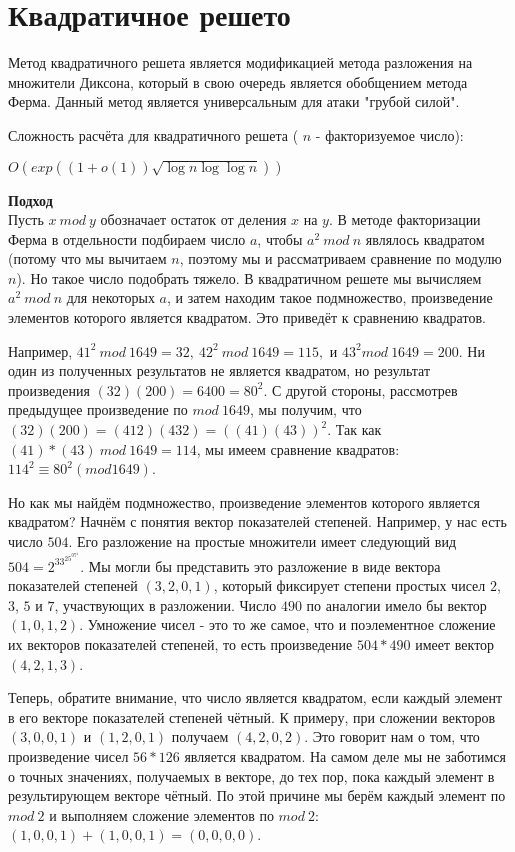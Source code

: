 \documentclass[12pt,a4paper]{scrartcl}
\begin{document}
\section{Квадратичное решето}

Метод квадратичного решета является модификацией метода разложения на множители Диксона, который в свою очередь является обобщением метода Ферма. Данный метод является универсальным для атаки "грубой силой".

Сложность расчёта для квадратичного решета ( $n$ - факторизуемое число):

\begin{center}
	$O(exp((1+o(1)){\sqrt {\log n\log \log n}}))$
\end{center}

\textbf{Подход}\\

Пусть $x\ mod\ y$ обозначает остаток от деления $x$ на $y$. В методе факторизации Ферма в отдельности подбираем число $a$, чтобы $a^2\ mod\ n$ являлось квадратом (потому что мы вычитаем $n$, поэтому мы и рассматриваем сравнение по модулю $n$). Но такое число подобрать тяжело. В квадратичном решете мы вычисляем $a^2\ mod\ n$ для некоторых $a$, и затем находим такое подмножество, произведение элементов которого является квадратом. Это приведёт к сравнению квадратов.

Например, $41^2\ mod\ 1649 = 32,\ 42^2\ mod\ 1649 = 115,$ и $43^2 mod\ 1649 = 200$. Ни один из полученных результатов не является квадратом, но результат произведения $(32)(200) = 6400 = 80^2$. С другой стороны, рассмотрев предыдущее произведение по $mod\ 1649$, мы получим, что $(32)(200) = (412)(432) = ((41)(43))^2$. Так как $(41)*(43)\ mod\ 1649 = 114$, мы имеем сравнение квадратов: $114^2 \equiv 80^2 (mod 1649)$.

Но как мы найдём подмножество, произведение элементов которого является квадратом? Начнём с понятия вектор показателей степеней. Например, у нас есть число $504$. Его разложение на простые множители имеет следующий вид $504 = 2^33^25^07^1$. Мы могли бы представить это разложение в виде вектора показателей степеней $(3,2,0,1)$, который фиксирует степени простых чисел $2$, $3$, $5$ и $7$, участвующих в разложении. Число $490$ по аналогии имело бы вектор $(1,0,1,2)$. Умножение чисел - это то же самое, что и поэлементное сложение их векторов показателей степеней, то есть произведение $504*490$ имеет вектор $(4,2,1,3)$.

Теперь, обратите внимание, что число является квадратом, если каждый элемент в его векторе показателей степеней чётный. К примеру, при сложении векторов $(3,0,0,1)$ и $(1,2,0,1)$ получаем $(4,2,0,2)$. Это говорит нам о том, что произведение чисел $56*126$ является квадратом. На самом деле мы не заботимся о точных значениях, получаемых в векторе, до тех пор, пока каждый элемент в результирующем векторе чётный. По этой причине мы берём каждый элемент по $mod\ 2$ и выполняем сложение элементов по $mod\ 2$: $(1,0,0,1) + (1,0,0,1) = (0,0,0,0)$.
\end{document}
